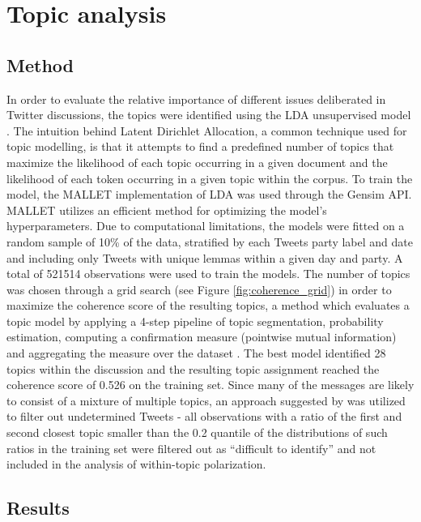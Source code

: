 \documentclass{article}
\begin{document}
	\clearpage
	
	\section*{Topic analysis}
	
	\subsection*{Method}
	
	In order to evaluate the relative importance of different issues deliberated in Twitter discussions, the topics were identified using the LDA unsupervised model \citep{pritchard2000, blei2003}. The intuition behind Latent Dirichlet Allocation, a common technique used for topic modelling, is that it attempts to find a predefined number of topics that maximize the likelihood of each topic occurring in a given document and the likelihood of each token occurring in a given topic within the corpus. To train the model, the MALLET implementation of LDA \citep{mccallum2002} was used through the Gensim API. MALLET utilizes an efficient method for optimizing the model’s hyperparameters. Due to computational limitations, the models were fitted on a random sample of 10\% of the data, stratified by each Tweets party label and date and including only Tweets with unique lemmas within a given day and party. A total of 521514 observations were used to train the models. The number of topics was chosen through a grid search (see Figure \ref{fig:coherence_grid}) in order to maximize the coherence score of the resulting topics, a method which evaluates a topic model by applying a 4-step pipeline of topic segmentation, probability estimation, computing a confirmation measure (pointwise mutual information) and aggregating the measure over the dataset \citep{roder2015}. The best model identified 28 topics within the discussion and the resulting topic assignment reached the coherence score of 0.526 on the training set. Since many of the messages are likely to consist of a mixture of multiple topics, an approach suggested by \citet{demszky2019} was utilized to filter out undetermined Tweets - all observations with a ratio of the first and second closest topic smaller than the 0.2 quantile of the distributions of such ratios in the training set were filtered out as “difficult to identify” and not included in the analysis of within-topic polarization.
	
	\subsection*{Results}
	
\end{document}
